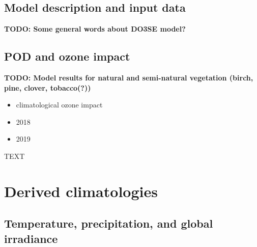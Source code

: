 \documentclass[bg, manuscript]{copernicus}
\begin{document}
\subsection{Model description and input data}

{\bf TODO: Some general words about DO3SE model?}
           

\subsection{POD and ozone impact}

{\bf TODO: Model results for natural and semi-natural vegetation (birch, pine, clover, tobacco(?))}
\begin{itemize}
\item climatological ozone impact
\item 2018
\item 2019
\end{itemize}


\conclusions  %
\label{sec:conc}
TEXT












\appendix
\section{Derived climatologies}    %

\subsection{Temperature, precipitation, and global irradiance}     %
\end{document}

